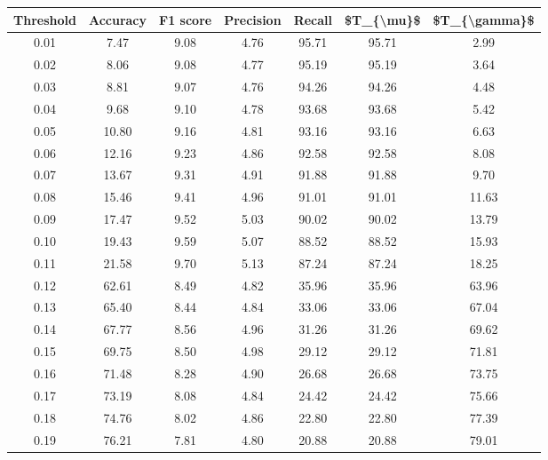 \begin{tabular}{|c|c|c|c|c|c|c|}
\toprule
 Threshold &  Accuracy &  F1 score &  Precision &  Recall &  \$T\_\{\textbackslash mu\}\$ &  \$T\_\{\textbackslash gamma\}\$ \\
\hline
      0.01 &      7.47 &      9.08 &       4.76 &   95.71 &      95.71 &          2.99 \\
      0.02 &      8.06 &      9.08 &       4.77 &   95.19 &      95.19 &          3.64 \\
      0.03 &      8.81 &      9.07 &       4.76 &   94.26 &      94.26 &          4.48 \\
      0.04 &      9.68 &      9.10 &       4.78 &   93.68 &      93.68 &          5.42 \\
      0.05 &     10.80 &      9.16 &       4.81 &   93.16 &      93.16 &          6.63 \\
      0.06 &     12.16 &      9.23 &       4.86 &   92.58 &      92.58 &          8.08 \\
      0.07 &     13.67 &      9.31 &       4.91 &   91.88 &      91.88 &          9.70 \\
      0.08 &     15.46 &      9.41 &       4.96 &   91.01 &      91.01 &         11.63 \\
      0.09 &     17.47 &      9.52 &       5.03 &   90.02 &      90.02 &         13.79 \\
      0.10 &     19.43 &      9.59 &       5.07 &   88.52 &      88.52 &         15.93 \\
      0.11 &     21.58 &      9.70 &       5.13 &   87.24 &      87.24 &         18.25 \\
      0.12 &     62.61 &      8.49 &       4.82 &   35.96 &      35.96 &         63.96 \\
      0.13 &     65.40 &      8.44 &       4.84 &   33.06 &      33.06 &         67.04 \\
      0.14 &     67.77 &      8.56 &       4.96 &   31.26 &      31.26 &         69.62 \\
      0.15 &     69.75 &      8.50 &       4.98 &   29.12 &      29.12 &         71.81 \\
      0.16 &     71.48 &      8.28 &       4.90 &   26.68 &      26.68 &         73.75 \\
      0.17 &     73.19 &      8.08 &       4.84 &   24.42 &      24.42 &         75.66 \\
      0.18 &     74.76 &      8.02 &       4.86 &   22.80 &      22.80 &         77.39 \\
      0.19 &     76.21 &      7.81 &       4.80 &   20.88 &      20.88 &         79.01 \\

\end{tabular}
